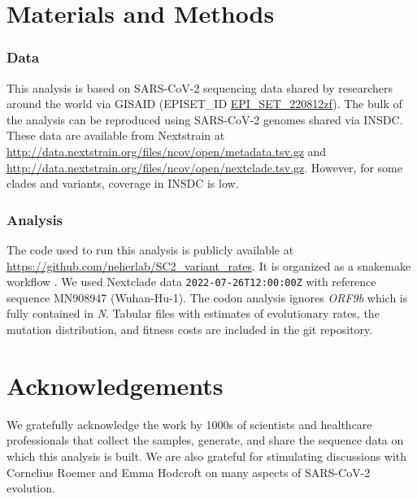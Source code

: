 \documentclass[aps,rmp, twocolumn]{revtex4}
\begin{document}
\section*{Materials and Methods}

\subsubsection*{Data}
This analysis is based on SARS-CoV-2 sequencing data shared by researchers around the world via GISAID \citep{shu_gisaid_2017} (EPISET\_ID \href{10.55876/gis8.220812zf}{EPI_SET_220812zf}).
The bulk of the analysis can be reproduced using SARS-CoV-2 genomes shared via INSDC.
These data are available from Nextstrain at \url{http://data.nextstrain.org/files/ncov/open/metadata.tsv.gz} and \url{http://data.nextstrain.org/files/ncov/open/nextclade.tsv.gz}.
However, for some clades and variants, coverage in INSDC is low.

\subsubsection*{Analysis}
The code used to run this analysis is publicly available at \url{https://github.com/neherlab/SC2_variant_rates}.
It is organized as a snakemake workflow \citep{koster_snakemakescalable_2012}.
We used Nextclade data \texttt{2022-07-26T12:00:00Z} with reference sequence MN908947 (Wuhan-Hu-1).
The codon analysis ignores \emph{ORF9b} which is fully contained in \emph{N}.
Tabular files with estimates of evolutionary rates, the mutation distribution, and fitness costs are included in the git repository.

\section*{Acknowledgements}
We gratefully acknowledge the work by 1000s of scientists and healthcare professionals that collect the samples, generate, and share the sequence data on which this analysis is built.
We are also grateful for stimulating discussions with Cornelius Roemer and Emma Hodcroft on many aspects of SARS-CoV-2 evolution.



\clearpage
\appendix

\clearpage
\onecolumngrid

% 
\end{document}
